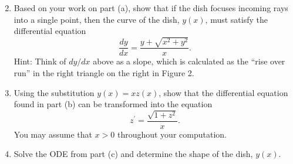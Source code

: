 \documentclass[12pt,letterpaper]{hmcpset}
\begin{document}
\begin{problem}[7]
\begin{enumerate}
  \begin{enumerate}
    \setcounter{enumi}{1}
    \item Based on your work on part (a), show that if the dish focuses
    incoming rays into a single point, then the curve of the dish,
    $y(x)$, must satisfy the differential equation
    \[
    \frac{dy}{dx} = \frac{y+\sqrt{x^2+y^2}}{x}.
    \]
    Hint:  Think of $dy/dx$ above as a slope, which is calculated as the ``rise over run'' in the right triangle on the right in Figure 2.
    
    \item  Using the substitution $y(x) = xz(x)$, show that the differential equation found in part (b) can be transformed into the equation
    \[
    z^\prime = \frac{\sqrt{1+z^2}}{x}.
    \]
    You may assume that $x>0$ throughout your computation.
    
    \item Solve the ODE from part (c) and determine the shape of the dish, $y(x)$.
  \end{enumerate}
  \end{enumerate}
\end{problem}
\newpage
\begin{solution}
  \null\vfill
\end{solution}
\end{document}
